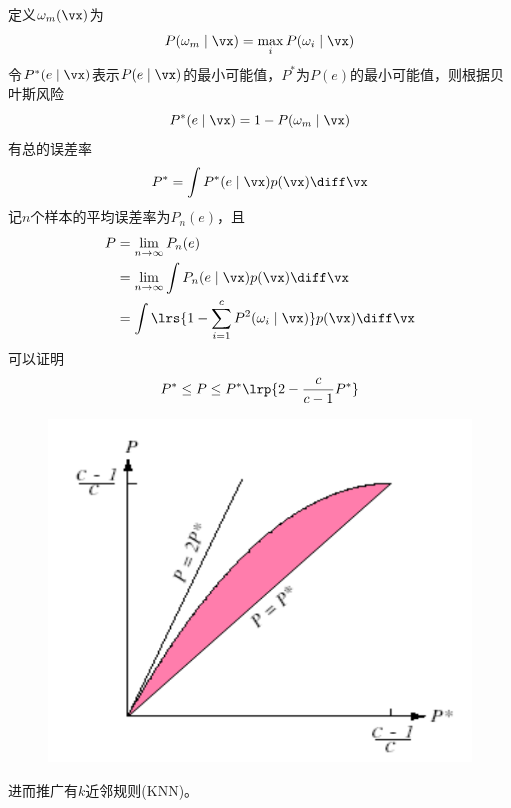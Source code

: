 定义$\omega_m(\vx)$为
\[P(\omega_m\mid\vx)=\max_i P(\omega_i\mid\vx)\]
令$P^*(e\mid\vx)$表示$P(e\mid\vx)$的最小可能值，$P^*$为$P(e)$的最小可能值，则根据贝叶斯风险
\[P^*(e\mid\vx)=1-P(\omega_m\mid\vx)\]
有总的误差率
\[P^*=\int P^*(e\mid\vx)p(\vx)\diff\vx\]
记$n$个样本的平均误差率为$P_n(e)$，且
\[\begin{aligned}
P&=\lim_{n\to\infty}P_n(e)\\
&=\lim_{n\to\infty}\int P_n(e\mid\vx)p(\vx)\diff\vx\\
&=\int\lrs{1-\sum_{i=1}^cP^2(\omega_i\mid\vx)}p(\vx)\diff\vx
\end{aligned}\]
可以证明
\[P^*\leq P\leq P^*\lrp{2-\frac{c}{c-1}P^*}\]
\begin{figure}[H]
\centering
\includegraphics[width=0.4\linewidth]{fig/kNN_error_bound.png}
\end{figure}

进而推广有$k$近邻规则(KNN)。